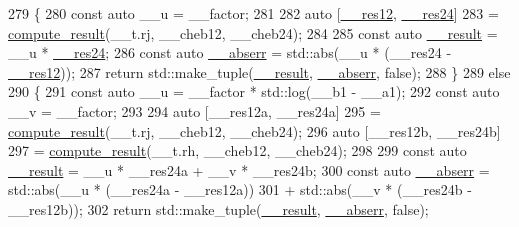 \begin{DoxyCode}
279             \{
280               \textcolor{keyword}{const} \textcolor{keyword}{auto} \_\_u = \_\_factor;
281 
282               \textcolor{keyword}{auto} [\hyperlink{namespace____gnu__cxx_a6ea2384a750bf3ec4778454ae3b4b5c3}{\_\_res12}, \hyperlink{namespace____gnu__cxx_af9fb40bd2c7cde535117200af946d670}{\_\_res24}]
283                 = \hyperlink{namespace____gnu__cxx_a10e06852570922cdc1aca86883b5161e}{compute\_result}(\_\_t.rj, \_\_cheb12, \_\_cheb24);
284 
285               \textcolor{keyword}{const} \textcolor{keyword}{auto} \hyperlink{namespace____gnu__cxx_a500ea9f53aeaecd8c2ae657503450578}{\_\_result} = \_\_u * \hyperlink{namespace____gnu__cxx_af9fb40bd2c7cde535117200af946d670}{\_\_res24};
286               \textcolor{keyword}{const} \textcolor{keyword}{auto} \hyperlink{namespace____gnu__cxx_a72f736cff127f1574e91a301de9e074b}{\_\_abserr} = std::abs(\_\_u * (\_\_res24 - \hyperlink{namespace____gnu__cxx_a6ea2384a750bf3ec4778454ae3b4b5c3}{\_\_res12}));
287               \textcolor{keywordflow}{return} std::make\_tuple(\hyperlink{namespace____gnu__cxx_a500ea9f53aeaecd8c2ae657503450578}{\_\_result}, \hyperlink{namespace____gnu__cxx_a72f736cff127f1574e91a301de9e074b}{\_\_abserr}, \textcolor{keyword}{false});
288             \}
289           \textcolor{keywordflow}{else}
290             \{
291               \textcolor{keyword}{const} \textcolor{keyword}{auto} \_\_u = \_\_factor * std::log(\_\_b1 - \_\_a1);
292               \textcolor{keyword}{const} \textcolor{keyword}{auto} \_\_v = \_\_factor;
293 
294               \textcolor{keyword}{auto} [\_\_res12a, \_\_res24a]
295                 = \hyperlink{namespace____gnu__cxx_a10e06852570922cdc1aca86883b5161e}{compute\_result}(\_\_t.rj, \_\_cheb12, \_\_cheb24);
296               \textcolor{keyword}{auto} [\_\_res12b, \_\_res24b]
297                 = \hyperlink{namespace____gnu__cxx_a10e06852570922cdc1aca86883b5161e}{compute\_result}(\_\_t.rh, \_\_cheb12, \_\_cheb24);
298 
299               \textcolor{keyword}{const} \textcolor{keyword}{auto} \hyperlink{namespace____gnu__cxx_a500ea9f53aeaecd8c2ae657503450578}{\_\_result} = \_\_u * \_\_res24a + \_\_v * \_\_res24b;
300               \textcolor{keyword}{const} \textcolor{keyword}{auto} \hyperlink{namespace____gnu__cxx_a72f736cff127f1574e91a301de9e074b}{\_\_abserr} = std::abs(\_\_u * (\_\_res24a - \_\_res12a))
301                                   + std::abs(\_\_v * (\_\_res24b - \_\_res12b));
302               \textcolor{keywordflow}{return} std::make\_tuple(\hyperlink{namespace____gnu__cxx_a500ea9f53aeaecd8c2ae657503450578}{\_\_result}, \hyperlink{namespace____gnu__cxx_a72f736cff127f1574e91a301de9e074b}{\_\_abserr}, \textcolor{keyword}{false});

\end{DoxyCode}
